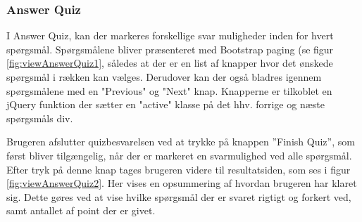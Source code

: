 \subsubsection{Answer Quiz}
I Answer Quiz, kan der markeres forskellige svar muligheder inden for hvert spørgsmål. Spørgsmålene bliver præsenteret med Bootstrap paging (se figur \ref{fig:viewAnswerQuiz1}, således at der er en list af knapper hvor det ønskede spørgsmål i rækken kan vælges. Derudover kan der også bladres igennem spørgsmålene med en "Previous" og "Next" knap. Knapperne er tilkoblet en jQuery funktion der sætter en "active" klasse på det hhv. forrige og næste spørgsmåls div.


Brugeren afslutter quizbesvarelsen ved at trykke på knappen ''Finish Quiz'', som først bliver tilgængelig, når der er markeret en svarmulighed ved alle spørgsmål. Efter tryk på denne knap tages brugeren videre til resultatsiden, som ses i figur \ref{fig:viewAnswerQuiz2}. Her vises en opsummering af hvordan brugeren har klaret sig. Dette gøres ved at vise hvilke spørgsmål der er svaret rigtigt og forkert ved, samt antallet af point der er givet.

